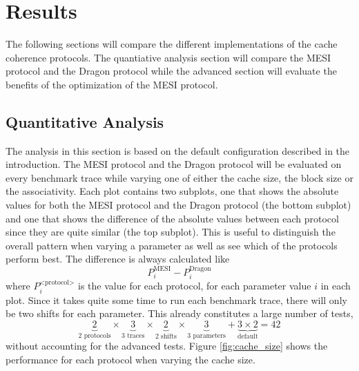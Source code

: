 \section{Results}
The following sections will compare the different implementations of the cache coherence protocols.
The quantiative analysis section will compare the MESI protocol and the Dragon protocol while the advanced section will evaluate the benefits of the optimization of the MESI protocol.

\subsection{Quantitative Analysis}


The analysis in this section is based on the default configuration described in the introduction.
The MESI protocol and the Dragon protocol will be evaluated on every benchmark trace while varying one of either the cache size, the block size or the associativity.
Each plot contains two subplots, one that shows the absolute values for both the MESI protocol and the Dragon protocol (the bottom subplot) and one that shows the difference of the absolute values between each protocol since they are quite similar (the top subplot).
This is useful to distinguish the overall pattern when varying a parameter as well as see which of the protocols perform best.
The difference is always calculated like
$$
P^\text{MESI}_i - P^\text{Dragon}_i
$$
where $ P^\text{<protocol>}_i $ is the value for each protocol, for each parameter value $i$ in each plot.
Since it takes quite some time to run each benchmark trace, there will only be two shifts for each parameter.
This already constitutes a large number of tests, 
$$
\underbrace{2}_\text{2 protocols} \times \underbrace{3}_\text{3 traces} \times \underbrace{2}_\text{2 shifts} \times \underbrace{3}_\text{3 parameters} + \underbrace{3 \times 2}_\text{default} = 42
$$
without accounting for the advanced tests.
Figure \ref{fig:cache_size} shows the performance for each protocol when varying the cache size.

